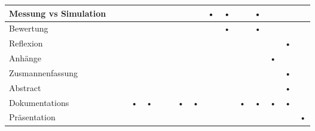 \begin{landscape}
\begin{longtable}{l|c|c|c|c|c|c|c|c|c|c|c|c|c|c|c}
\hline 
Messung vs Simulation &  &  &  &  &  &  &  &  & \cellcolor{gray!50}• & \cellcolor{gray!50}• &  & \cellcolor{gray!50}• &  &  & \\ 
\hline 
 Bewertung &  &  &  &   &  &  &  &  &  & \cellcolor{gray!50}• & & \cellcolor{gray!50}• & &\\
\hline 
Reflexion & &  &  &  &  &  &  &  &  &  &  &  & & \cellcolor{gray!50}•&\\ 
\hline 
Anhänge &  & &  &  &  &  &  &  &  &  &  &  & \cellcolor{gray!50}•& &\\ 
\hline 
Zusmannenfassung &  &  &  &  & &  &  &    &  &  &  & &  & \cellcolor{gray!50}•&\\ 
\hline 
Abstract &  &  &  &  &  &  &  & &  &  &  &  & & \cellcolor{gray!50}•&  \\ 
\hline 
Dokumentations  &  &  & \cellcolor{gray!50}• & \cellcolor{gray!50}• & &  & \cellcolor{gray!50}• & \cellcolor{gray!50}• &  & &\cellcolor{gray!50}• & \cellcolor{gray!50}•& \cellcolor{gray!50}• & \cellcolor{gray!50}• \\ 
\hline 
Präsentation & &  &  &  &  &  &  &  &  & & & &   &  & \cellcolor{gray!50}•\\ %
\end{longtable} 
\end{landscape}